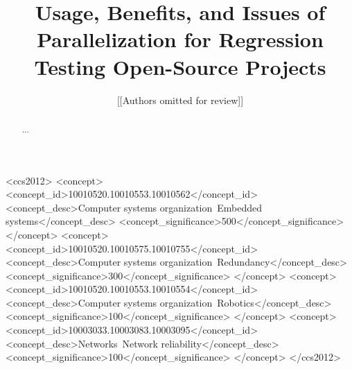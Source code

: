 \documentclass[sigconf]{acmart}
\begin{document}






\title{Usage, Benefits, and Issues of Parallelization for Regression Testing Open-Source Projects}





\author{[[Authors omitted for review]]}


\begin{abstract}
  ...
\end{abstract}


\begin{CCSXML}
<ccs2012>
 <concept>
  <concept_id>10010520.10010553.10010562</concept_id>
  <concept_desc>Computer systems organization~Embedded systems</concept_desc>
  <concept_significance>500</concept_significance>
 </concept>
 <concept>
  <concept_id>10010520.10010575.10010755</concept_id>
  <concept_desc>Computer systems organization~Redundancy</concept_desc>
  <concept_significance>300</concept_significance>
 </concept>
 <concept>
  <concept_id>10010520.10010553.10010554</concept_id>
  <concept_desc>Computer systems organization~Robotics</concept_desc>
  <concept_significance>100</concept_significance>
 </concept>
 <concept>
  <concept_id>10003033.10003083.10003095</concept_id>
  <concept_desc>Networks~Network reliability</concept_desc>
  <concept_significance>100</concept_significance>
 </concept>
</ccs2012>  
\end{CCSXML}
\end{document}

